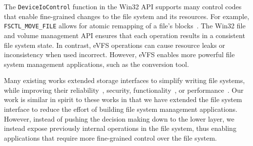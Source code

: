The \texttt{DeviceIoControl} function in the Win32 API supports many control codes that enable fine-grained changes to the file system and its resources. For example, \texttt{FSCTL\_MOVE\_FILE} allows for atomic remapping of a file's blocks~\cite{win32-defrag}. The Win32 file and volume management API ensures that each operation results in a consistent file system state. In contrast, eVFS operations can cause resource leaks or inconsistency when used incorrect. However, eVFS enables more powerful file system management applications, such as the conversion tool. 



Many existing works extended storage interfaces to simplify writing file systems, while improving their reliability~\cite{Sivathanu06}, security, functionality~\cite{shin2016isotope}, or performance~\cite{zhang2012nameless,anand08rangewrites}. Our work is similar in spirit to these works in that we have extended the file system interface to reduce the effort of building file system management applications. However, instead of pushing the decision making down to the lower layer, we instead expose previously internal operations in the file system, thus enabling applications that require more fine-grained control over the file system.

\vspace{-1ex}
